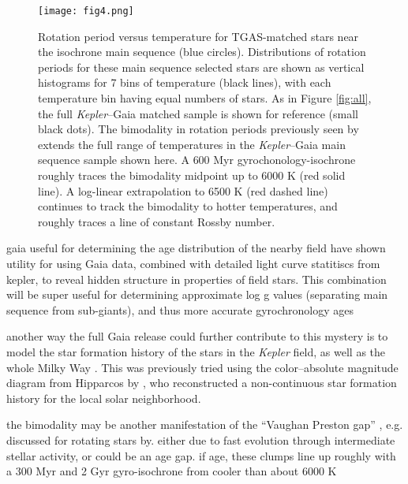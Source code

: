\documentclass[manuscript, letterpaper]{aastex6}
\makeatletter
\let\origsection\section
\renewcommand\section{\@ifstar{\starsection}{\nostarsection}}
\newcommand\nostarsection[1]{\sectionprelude\origsection{#1}}
\newcommand\starsection[1]{\sectionprelude\origsection*{#1}}
\newcommand\sectionprelude{\vspace{1em}}
\newcommand{\Kepler}{\textsl{Kepler}\xspace}
\makeatother
\begin{document}
\begin{figure}[]
\centering
\texttt{[image: fig4.png]}
\caption{ Rotation period versus temperature for TGAS-matched stars near the isochrone main sequence (blue circles). Distributions of rotation periods for these main sequence selected stars are shown as vertical histograms for 7 bins of temperature (black lines), with each temperature bin having equal numbers of stars. As in Figure \ref{fig:all}, the full \Kepler--Gaia matched sample is shown for reference (small black dots). The bimodality in rotation periods previously seen by \citet{mcquillan2014} extends the full range of temperatures in the \Kepler--Gaia main sequence sample shown here.
A \citet{meibom2011} 600 Myr gyrochonology-isochrone roughly traces the bimodality midpoint up to 6000 K (red solid line). A log-linear extrapolation to 6500 K (red dashed line) continues to track the bimodality to hotter temperatures, and roughly traces a line of constant Rossby number.
}
\label{fig:gyro}
\end{figure}




\section{Discussion}
gaia useful for determining the age distribution of the nearby field
have shown utility for using Gaia data, combined with detailed light curve statitiscs from kepler, to reveal hidden structure in properties of field stars. This combination will be super useful for determining approximate log g values (separating main sequence from sub-giants), and thus more accurate gyrochronology ages \citep{van-saders2013}

another way the full Gaia release could further contribute to this mystery is to model the star formation history of the stars in the \Kepler field, as well as the whole Milky Way \citep[e.g.][]{bertelli1999}. This was previously tried using the color--absolute magnitude diagram from Hipparcos by \citet{hernandez2000}, who reconstructed a non-continuous star formation history for the local solar neighborhood.

the bimodality may be another manifestation of the ``Vaughan Preston gap'' \citep{vaughan1980}, e.g. discussed for rotating stars by\citet{kado-fong2016}.
either due to fast evolution through intermediate stellar activity, or could be an age gap. if age, these clumps line up roughly with a 300 Myr and 2 Gyr \citet{meibom2011} gyro-isochrone from cooler than about 6000 K
\end{document}
